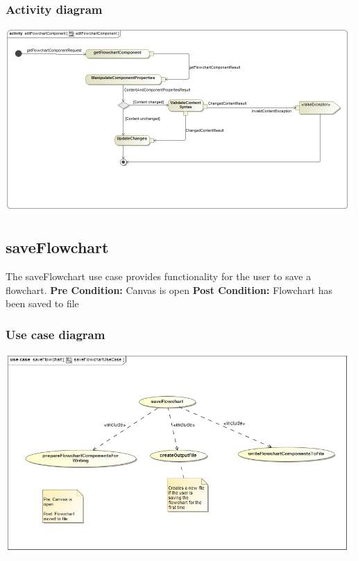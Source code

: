 \documentclass[11pt,a4paper,titlepage]{article}
\begin{document}
\subsubsection{Activity diagram}
\includegraphics[width=500px]{editFowchartComponent.jpg}

\subsection{saveFlowchart}
The saveFlowchart use case provides functionality for the user to save a flowchart.\newline\newline
\textbf{Pre Condition:} Canvas is open\newline\newline
\textbf{Post Condition:} Flowchart has been saved to file

\subsubsection{Use case diagram}
\includegraphics[width=500px]{saveFlowchartUseCase.jpg}
\end{document}
